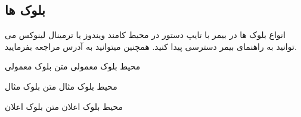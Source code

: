 \documentclass[xcolor=svgnames,10pt]{beamer}
\begin{document}
\subsection{بلوک ها}
\begin{frame}[t]{انواع بلوک ها در بیمر}
با تایپ دستور
در محیط کامند ویندوز یا ترمینال لینوکس می توانید به راهنمای بیمر دسترسی پیدا کنید.
همچنین میتوانید به آدرس
مراجعه بفرمایید.
\begin{block}{محیط بلوک معمولی}
متن بلوک معمولی
\end{block}
\begin{exampleblock}{محیط بلوک مثال}
متن بلوک مثال
\end{exampleblock}
\begin{alertblock}{محیط بلوک اعلان}
متن بلوک اعلان
\end{alertblock}
\end{frame}
\end{document}
